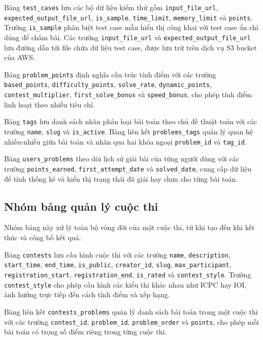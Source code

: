 \documentclass[12pt, a4paper]{report}
\begin{document}
Bảng \texttt{test\_cases} lưu các bộ dữ liệu kiểm thử gồm \texttt{input\_file\_url}, \texttt{expected\_output\_file\_url}, \texttt{is\_sample}, \texttt{time\_limit}, \texttt{memory\_limit} và \texttt{points}. Trường \texttt{is\_sample} phân biệt test case mẫu hiển thị công khai với test case ẩn chỉ dùng để chấm bài. Các trường \texttt{input\_file\_url} và \texttt{expected\_output\_file\_url} lưu đường dẫn tới file chứa dữ liệu test case, được lưu trữ trên dịch vụ S3 bucket của AWS.

Bảng \texttt{problem\_points} định nghĩa cấu trúc tính điểm với các trường \texttt{based\_points}, \texttt{difficulty\_points}, \texttt{solve\_rate}, \texttt{dynamic\_points}, \texttt{contest\_multiplier}, \texttt{first\_solve\_bonus} và \texttt{speed\_bonus}, cho phép tính điểm linh hoạt theo nhiều tiêu chí.

Bảng \texttt{tags} lưu danh sách nhãn phân loại bài toán theo chủ đề thuật toán với các trường \texttt{name}, \texttt{slug} và \texttt{is\_active}. Bảng liên kết \texttt{problems\_tags} quản lý quan hệ nhiều-nhiều giữa bài toán và nhãn qua hai khóa ngoại \texttt{problem\_id} và \texttt{tag\_id}.

Bảng \texttt{users\_problems} theo dõi lịch sử giải bài của từng người dùng với các trường \texttt{points\_earned}, \texttt{first\_attempt\_date} và \texttt{solved\_date}, cung cấp dữ liệu để tính thống kê và hiển thị trạng thái đã giải hay chưa cho từng bài toán.

\subsection{Nhóm bảng quản lý cuộc thi}

Nhóm bảng này xử lý toàn bộ vòng đời của một cuộc thi, từ khi tạo đến khi kết thúc và công bố kết quả.

Bảng \texttt{contests} lưu cấu hình cuộc thi với các trường \texttt{name}, \texttt{description}, \texttt{start\_time}, \texttt{end\_time}, \texttt{is\_public}, \texttt{creator\_id}, \texttt{slug}, \texttt{max\_participant}, \texttt{registration\_start}, \texttt{registration\_end}, \texttt{is\_rated} và \texttt{contest\_style}. Trường \texttt{contest\_style} cho phép cấu hình các kiểu thi khác nhau như ICPC hay IOI, ảnh hưởng trực tiếp đến cách tính điểm và xếp hạng.

Bảng liên kết \texttt{contests\_problems} quản lý danh sách bài toán trong một cuộc thi với các trường \texttt{contest\_id}, \texttt{problem\_id}, \texttt{problem\_order} và \texttt{points}, cho phép mỗi bài toán có trọng số điểm riêng trong từng cuộc thi.
\end{document}

